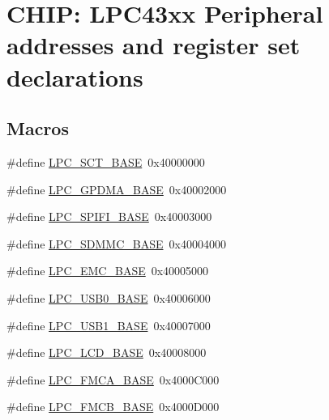 \hypertarget{group___p_e_r_i_p_h__43_x_x___b_a_s_e}{}\section{C\+H\+IP\+: L\+P\+C43xx Peripheral addresses and register set declarations}
\label{group___p_e_r_i_p_h__43_x_x___b_a_s_e}
\subsection*{Macros}
\begin{DoxyCompactItemize}
\item 
\#define \hyperlink{group___p_e_r_i_p_h__43_x_x___b_a_s_e_gad39ca0e94488b4bee5510b2e8bc5a708}{L\+P\+C\+\_\+\+S\+C\+T\+\_\+\+B\+A\+SE}~0x40000000
\item 
\#define \hyperlink{group___p_e_r_i_p_h__43_x_x___b_a_s_e_ga51ba8e3f33730fa2b78be3f892d8c278}{L\+P\+C\+\_\+\+G\+P\+D\+M\+A\+\_\+\+B\+A\+SE}~0x40002000
\item 
\#define \hyperlink{group___p_e_r_i_p_h__43_x_x___b_a_s_e_gad284a5971366e0a8b5fe9881fdb9aa0c}{L\+P\+C\+\_\+\+S\+P\+I\+F\+I\+\_\+\+B\+A\+SE}~0x40003000
\item 
\#define \hyperlink{group___p_e_r_i_p_h__43_x_x___b_a_s_e_ga4175c6e418d0b209c42f789cfa9ff32b}{L\+P\+C\+\_\+\+S\+D\+M\+M\+C\+\_\+\+B\+A\+SE}~0x40004000
\item 
\#define \hyperlink{group___p_e_r_i_p_h__43_x_x___b_a_s_e_ga52f586bf3c6855ad4ef03b1fee3f2f0d}{L\+P\+C\+\_\+\+E\+M\+C\+\_\+\+B\+A\+SE}~0x40005000
\item 
\#define \hyperlink{group___p_e_r_i_p_h__43_x_x___b_a_s_e_ga41d15fd328f821807d202d6c9feb096c}{L\+P\+C\+\_\+\+U\+S\+B0\+\_\+\+B\+A\+SE}~0x40006000
\item 
\#define \hyperlink{group___p_e_r_i_p_h__43_x_x___b_a_s_e_ga72922dbb8f7e3016015922b225773710}{L\+P\+C\+\_\+\+U\+S\+B1\+\_\+\+B\+A\+SE}~0x40007000
\item 
\#define \hyperlink{group___p_e_r_i_p_h__43_x_x___b_a_s_e_gae1746cd618a1eb4f24f95255594f159a}{L\+P\+C\+\_\+\+L\+C\+D\+\_\+\+B\+A\+SE}~0x40008000
\item 
\#define \hyperlink{group___p_e_r_i_p_h__43_x_x___b_a_s_e_gaf59ae457b89f9991f1528a5625234445}{L\+P\+C\+\_\+\+F\+M\+C\+A\+\_\+\+B\+A\+SE}~0x4000\+C000
\item 
\#define \hyperlink{group___p_e_r_i_p_h__43_x_x___b_a_s_e_ga9c9492ce5a1b5e99d6500db256f020c6}{L\+P\+C\+\_\+\+F\+M\+C\+B\+\_\+\+B\+A\+SE}~0x4000\+D000

\end{DoxyCompactItemize}
